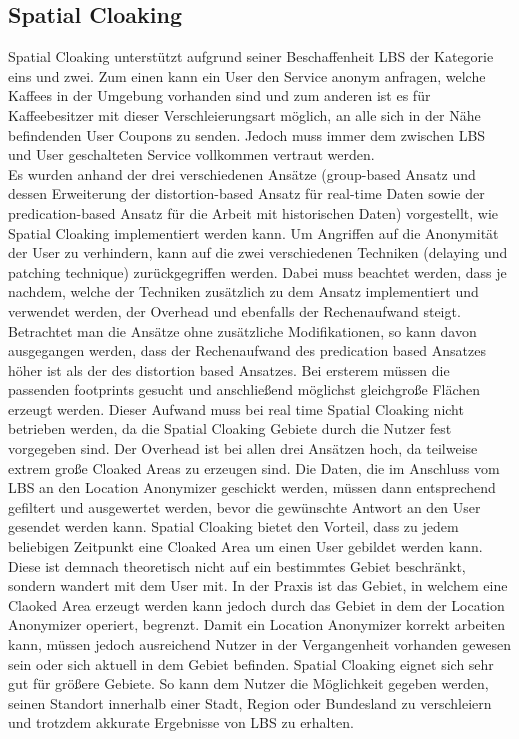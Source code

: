 \subsection{Spatial Cloaking}
Spatial Cloaking unterstützt aufgrund seiner Beschaffenheit LBS der Kategorie eins und zwei. Zum einen kann ein User den Service anonym anfragen, welche Kaffees in der Umgebung vorhanden sind und zum anderen ist es für Kaffeebesitzer mit dieser Verschleierungsart möglich, an alle sich in der Nähe befindenden User Coupons zu senden. Jedoch muss immer dem zwischen LBS und User geschalteten Service vollkommen vertraut werden. \\
Es wurden anhand der drei verschiedenen Ansätze (group-based Ansatz und dessen Erweiterung der distortion-based Ansatz für real-time Daten sowie der predication-based Ansatz für die Arbeit mit historischen Daten) vorgestellt, wie Spatial Cloaking implementiert werden kann. Um Angriffen auf die Anonymität der User zu verhindern, kann auf die zwei verschiedenen Techniken (delaying und patching technique) zurückgegriffen werden. Dabei muss beachtet werden, dass je nachdem, welche der Techniken zusätzlich zu dem Ansatz implementiert und verwendet werden, der Overhead und ebenfalls der Rechenaufwand steigt. Betrachtet man die Ansätze ohne zusätzliche Modifikationen, so kann davon ausgegangen werden, dass der Rechenaufwand des predication based Ansatzes höher ist als der des distortion based Ansatzes. Bei ersterem müssen die passenden footprints gesucht und anschließend möglichst gleichgroße Flächen erzeugt werden. Dieser Aufwand muss bei real time Spatial Cloaking nicht betrieben werden, da die Spatial Cloaking Gebiete durch die Nutzer fest vorgegeben sind. Der Overhead ist bei allen drei Ansätzen hoch, da teilweise extrem große Cloaked Areas zu erzeugen sind. Die Daten, die im Anschluss vom LBS an den Location Anonymizer geschickt werden, müssen dann entsprechend gefiltert und ausgewertet werden, bevor die gewünschte Antwort an den User gesendet werden kann. Spatial Cloaking bietet den Vorteil, dass zu jedem beliebigen Zeitpunkt eine Cloaked Area um einen User gebildet werden kann. Diese ist demnach theoretisch nicht auf ein bestimmtes Gebiet beschränkt, sondern wandert mit dem User mit. In der Praxis ist das Gebiet, in welchem eine Claoked Area erzeugt werden kann jedoch durch das Gebiet in dem der Location Anonymizer operiert, begrenzt. Damit ein Location Anonymizer korrekt arbeiten kann, müssen jedoch ausreichend Nutzer in der Vergangenheit vorhanden gewesen sein oder sich aktuell in dem Gebiet befinden. Spatial Cloaking eignet sich sehr gut für größere Gebiete. So kann dem Nutzer die Möglichkeit gegeben werden, seinen Standort innerhalb einer Stadt, Region oder Bundesland zu verschleiern und trotzdem akkurate Ergebnisse von LBS zu erhalten.
